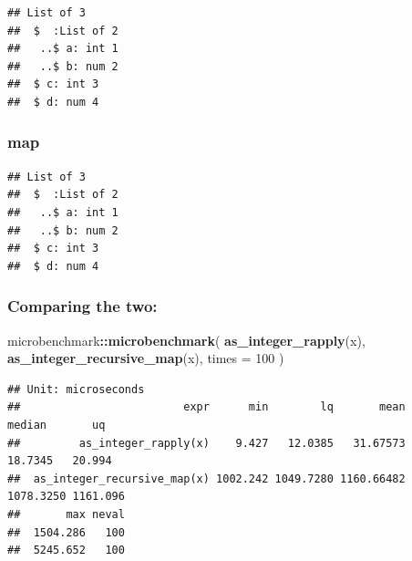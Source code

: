 \documentclass[]{book}
\newenvironment{Shaded}{\begin{snugshade}}{\end{snugshade}}
\newcommand{\ControlFlowTok}[1]{\textcolor[rgb]{0.13,0.29,0.53}{\textbf{#1}}}
\newcommand{\DataTypeTok}[1]{\textcolor[rgb]{0.13,0.29,0.53}{#1}}
\newcommand{\DecValTok}[1]{\textcolor[rgb]{0.00,0.00,0.81}{#1}}
\newcommand{\KeywordTok}[1]{\textcolor[rgb]{0.13,0.29,0.53}{\textbf{#1}}}
\newcommand{\NormalTok}[1]{#1}
\newcommand{\OperatorTok}[1]{\textcolor[rgb]{0.81,0.36,0.00}{\textbf{#1}}}
\newcommand{\StringTok}[1]{\textcolor[rgb]{0.31,0.60,0.02}{#1}}
\begin{document}
\begin{verbatim}
## List of 3
##  $  :List of 2
##   ..$ a: int 1
##   ..$ b: num 2
##  $ c: int 3
##  $ d: num 4
\end{verbatim}

\hypertarget{map}{%
\subsubsection{map}\label{map}}

\begin{Shaded}
\end{Shaded}

\begin{verbatim}
## List of 3
##  $  :List of 2
##   ..$ a: int 1
##   ..$ b: num 2
##  $ c: int 3
##  $ d: num 4
\end{verbatim}

\hypertarget{comparing-the-two}{%
\subsubsection{Comparing the two:}\label{comparing-the-two}}

\begin{Shaded}
\begin{Highlighting}[]
\NormalTok{microbenchmark}\OperatorTok{::}\KeywordTok{microbenchmark}\NormalTok{(}
  \KeywordTok{as_integer_rapply}\NormalTok{(x),}
  \KeywordTok{as_integer_recursive_map}\NormalTok{(x),}
  \DataTypeTok{times =} \DecValTok{100}
\NormalTok{)}
\end{Highlighting}
\end{Shaded}

\begin{verbatim}
## Unit: microseconds
##                         expr      min        lq       mean    median       uq
##         as_integer_rapply(x)    9.427   12.0385   31.67573   18.7345   20.994
##  as_integer_recursive_map(x) 1002.242 1049.7280 1160.66482 1078.3250 1161.096
##       max neval
##  1504.286   100
##  5245.652   100
\end{verbatim}
\end{document}

